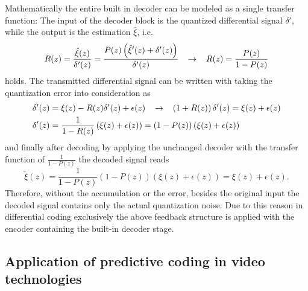 Mathematically the entire built in decoder can be modeled as a single transfer function:
The input of the decoder block is the quantized differential signal $\delta'$, while the output is the estimation $\hat{\xi}$, i.e.
\begin{equation}
R(z) = \frac{\hat{\xi}(z)}{\delta'(z)} = \frac{P(z) \left( \hat{\xi}'(z) + \delta'(z) \right) }{\delta'(z)} \hspace{0.3cm}
\rightarrow \hspace{0.3cm}
R(z) = \frac{P(z)}{1-P(z)}
\end{equation}
holds.
The transmitted differential signal can be written with taking the quantization error into consideration as
\begin{align}
\begin{split}
\delta'(z) &= \xi(z) - R(z)\delta'(z) + \epsilon(z) \hspace{3mm} \rightarrow \hspace{3mm} \left( 1 + R(z) \right) \delta'(z) = \xi(z) + \epsilon(z) \\
\delta'(z) &=  \frac{1}{1-R(z)} \left( \xi(z) + \epsilon(z) \right) = (1-P(z)) \left( \xi(z) + \epsilon(z) \right)
\end{split}
\end{align}
and finally after decoding by applying the unchanged decoder with the transfer function of $\frac{1}{1-P(z)}$ the decoded signal reads
\begin{equation}
\tilde{\xi}(z) = \frac{1}{1-P(z)}(1-P(z)) \left( \xi(z) + \epsilon(z) \right) = \xi(z) + \epsilon(z).
\end{equation}
Therefore, without the accumulation or the error, besides the original input the decoded signal contains only the actual quantization noise.
Due to this reason in differential coding exclusively the above feedback structure is applied with the encoder containing the built-in decoder stage.

\subsection{Application of predictive coding in video technologies}

